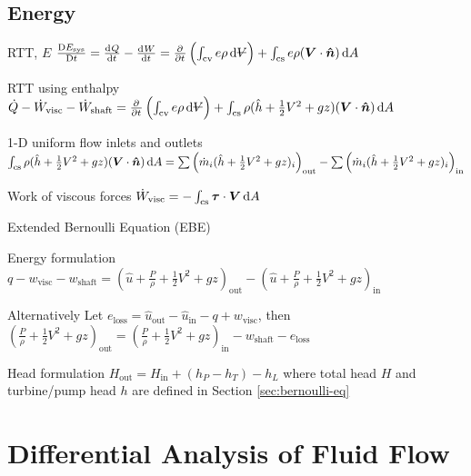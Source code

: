 \documentclass{article}
\begin{document}
\subsection{Energy}
\begin{description*}
\item[RTT, $E$]
  \(\frac{\Dif E_\mathrm{sys}}{\Dif t}
  = \od{Q}{t}-\od{W}{t}
  = \pd{}{t}\left(\int_\mathrm{cv}e\rho\dif{\volsym}\right)
  + \int_\mathrm{cs}e\rho(\vec{V}\cdot\uvec{n})\dif{A}\)
\item[RTT using enthalpy]
  \(\dot{Q}-\dot{W}_\mathrm{visc}-\dot{W}_\mathrm{shaft}
  = \pd{}{t}\left(\int_\mathrm{cv}e\rho\dif{\volsym}\right)
  + \int_\mathrm{cs}\rho(\hat{h}+\frac{1}{2}V^2+gz)(\vec{V}\cdot\uvec{n})\dif{A}\)
\item[1-D uniform flow inlets and outlets]~\\
  \(\int_\mathrm{cs}\rho(\hat{h}+\frac{1}{2}V^2+gz)(\vec{V}\cdot\uvec{n})\dif{A}
  = \sum\left(\dot{m}_i(\hat{h}+\frac{1}{2}V^2+gz)_i\right)_\mathrm{out}
  - \sum\left(\dot{m}_i(\hat{h}+\frac{1}{2}V^2+gz)_i\right)_\mathrm{in}\)
\item[Work of viscous forces]
  \(\dot{W}_\mathrm{visc} = -\int_\mathrm{cs}\vec\tau\cdot\vec{V}\dif{A}\)
\item[Extended Bernoulli Equation (EBE)]~
  \begin{description*}
  \item[Energy formulation]
    \(q - w_\mathrm{visc} - w_\mathrm{shaft}
    = \left(\hat{u}+\frac{P}{\rho}+\frac{1}{2}V^2+gz\right)_\mathrm{out}
    - \left(\hat{u}+\frac{P}{\rho}+\frac{1}{2}V^2+gz\right)_\mathrm{in}\)
  \item[Alternatively]
    Let \(e_\mathrm{loss} = \hat{u}_\mathrm{out}-\hat{u}_\mathrm{in}-q+w_\mathrm{visc}\), then \\
    \(\left(\frac{P}{\rho}+\frac{1}{2}V^2+gz\right)_\mathrm{out}
    = \left(\frac{P}{\rho}+\frac{1}{2}V^2+gz\right)_\mathrm{in}
    - w_\mathrm{shaft} - e_\mathrm{loss}\)
  \item[Head formulation]
    \(H_\mathrm{out} = H_\mathrm{in} + (h_P-h_T) - h_L\)
    where total head $H$ and turbine\slash{}pump head $h$ are defined in
    Section \ref{sec:bernoulli-eq}
  \end{description*}
\end{description*}

\section{Differential Analysis of Fluid Flow}
\end{document}
